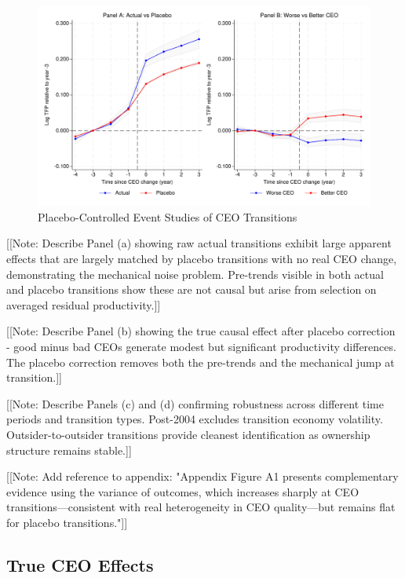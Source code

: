 \documentclass[11pt,a4paper]{article}
\begin{document}
\begin{figure}[htbp]
\centering
\includegraphics[width=\textwidth]{figure/event_study.pdf}
\caption{Placebo-Controlled Event Studies of CEO Transitions}
\label{fig:event_study_main}
\end{figure}

[[Note: Describe Panel (a) showing raw actual transitions exhibit large apparent effects that are largely matched by placebo transitions with no real CEO change, demonstrating the mechanical noise problem. Pre-trends visible in both actual and placebo transitions show these are not causal but arise from selection on averaged residual productivity.]]

[[Note: Describe Panel (b) showing the true causal effect after placebo correction - good minus bad CEOs generate modest but significant productivity differences. The placebo correction removes both the pre-trends and the mechanical jump at transition.]]

[[Note: Describe Panels (c) and (d) confirming robustness across different time periods and transition types. Post-2004 excludes transition economy volatility. Outsider-to-outsider transitions provide cleanest identification as ownership structure remains stable.]]

[[Note: Add reference to appendix: "Appendix Figure A1 presents complementary evidence using the variance of outcomes, which increases sharply at CEO transitions—consistent with real heterogeneity in CEO quality—but remains flat for placebo transitions."]]

\subsection{True CEO Effects}
\end{document}
